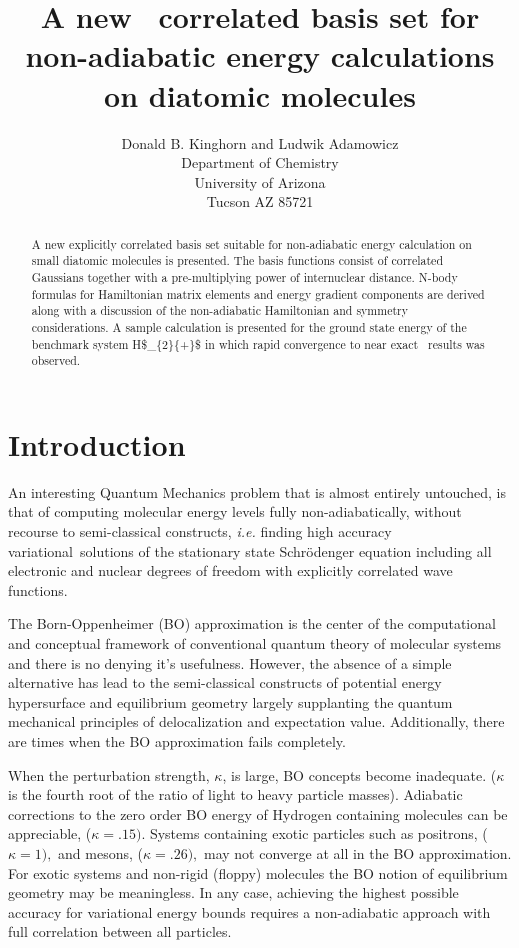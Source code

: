 \documentclass[12pt]{article}
\begin{document}
\title{A new \ correlated basis set for non-adiabatic energy calculations on diatomic molecules}
\author{Donald B. Kinghorn and Ludwik Adamowicz\\Department of Chemistry\\University of Arizona\\Tucson AZ 85721}
\maketitle
\begin{abstract}
A new explicitly correlated basis set suitable for non-adiabatic energy
calculation on small diatomic molecules is presented. The basis functions
consist of correlated Gaussians together with a pre-multiplying power of
internuclear distance. N-body formulas for Hamiltonian matrix elements and
energy gradient components are derived along with a discussion of the
non-adiabatic Hamiltonian and symmetry considerations. A sample calculation is
presented for the ground state energy of the benchmark system
H\$\_\{2\}\{+\}\$ in which rapid convergence to near exact
\ results was observed. 
\end{abstract}



\section{Introduction}

An interesting Quantum Mechanics problem that is almost entirely untouched, is
that of computing molecular energy levels fully non-adiabatically, without
recourse to semi-classical constructs, \textit{i.e.} finding high accuracy
variational\ solutions of the stationary state Schr\"{o}denger equation
including all electronic and nuclear degrees of freedom with explicitly
correlated wave functions.

The Born-Oppenheimer (BO) approximation is the center of the computational and
conceptual framework of conventional quantum theory of molecular systems and
there is no denying it's usefulness. However, the absence of a simple
alternative has lead to the semi-classical constructs of potential energy
hypersurface and equilibrium geometry largely supplanting the quantum
mechanical principles of delocalization and expectation value. Additionally,
there are times when the BO approximation fails completely.

When the perturbation strength, $\kappa$,  is large, BO concepts become
inadequate. ($\kappa$ is the fourth root of the ratio of light to heavy
particle masses). Adiabatic corrections to the zero order BO energy of
Hydrogen containing molecules can be appreciable, ($\kappa=.15)$. Systems
containing exotic particles such as positrons, ($\kappa=1),$ and mesons,
($\kappa=.26),$ may not converge at all in the BO approximation. For exotic
systems and non-rigid (floppy) molecules the BO notion of equilibrium geometry
may be meaningless.  In any case, achieving the highest possible accuracy for
variational energy bounds requires a non-adiabatic approach with full
correlation between all particles. 
\end{document}
